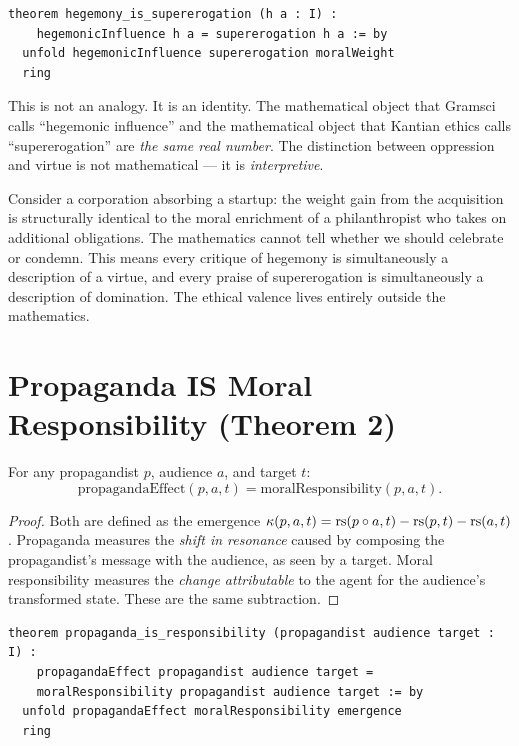 \begin{lstlisting}
theorem hegemony_is_supererogation (h a : I) :
    hegemonicInfluence h a = supererogation h a := by
  unfold hegemonicInfluence supererogation moralWeight
  ring
\end{lstlisting}

\begin{interpretation}
This is not an analogy.  It is an identity.  The mathematical object that Gramsci calls ``hegemonic influence'' and the mathematical object that Kantian ethics calls ``supererogation'' are \emph{the same real number}.  The distinction between oppression and virtue is not mathematical --- it is \emph{interpretive}.

Consider a corporation absorbing a startup: the weight gain from the acquisition is structurally identical to the moral enrichment of a philanthropist who takes on additional obligations.  The mathematics cannot tell whether we should celebrate or condemn.  This means every critique of hegemony is simultaneously a description of a virtue, and every praise of supererogation is simultaneously a description of domination.  The ethical valence lives entirely outside the mathematics.
\end{interpretation}


\section{Propaganda IS Moral Responsibility (Theorem 2)}

\begin{theorem}
\label{thm:propaganda-responsibility}
For any propagandist $p$, audience $a$, and target $t$:
\[
\text{propagandaEffect}(p, a, t) = \text{moralResponsibility}(p, a, t).
\]
\end{theorem}

\begin{proof}
Both are defined as the emergence $\kappa(p, a, t) = \operatorname{rs}(p \circ a, t) - \operatorname{rs}(p, t) - \operatorname{rs}(a, t)$.  Propaganda measures the \emph{shift in resonance} caused by composing the propagandist's message with the audience, as seen by a target.  Moral responsibility measures the \emph{change attributable} to the agent for the audience's transformed state.  These are the same subtraction.
\end{proof}

\begin{lstlisting}
theorem propaganda_is_responsibility (propagandist audience target : I) :
    propagandaEffect propagandist audience target =
    moralResponsibility propagandist audience target := by
  unfold propagandaEffect moralResponsibility emergence
  ring
\end{lstlisting}

